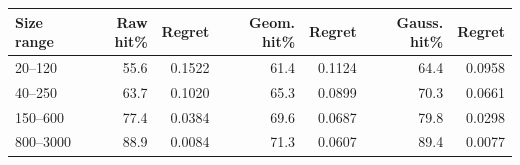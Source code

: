 \begin{tabular}{lrrrrrr}
\toprule
Size range & Raw hit\% & Regret & Geom. hit\% & Regret & Gauss. hit\% & Regret \\
\midrule
20--120 & 55.6 & 0.1522 & 61.4 & 0.1124 & 64.4 & 0.0958 \\
40--250 & 63.7 & 0.1020 & 65.3 & 0.0899 & 70.3 & 0.0661 \\
150--600 & 77.4 & 0.0384 & 69.6 & 0.0687 & 79.8 & 0.0298 \\
800--3000 & 88.9 & 0.0084 & 71.3 & 0.0607 & 89.4 & 0.0077 \\
\bottomrule
\end{tabular}
